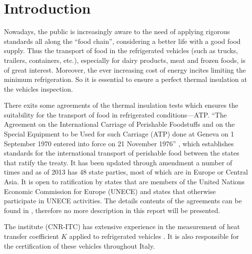 \newpage
\section{Introduction}
Nowadays, the public is increasingly aware to the need of applying rigorous standards all along the ``food chain'', considering a better life with a good food supply.  Thus the transport of food in the refrigerated vehicles (such as trucks, trailers, containers, etc.), especially for dairy products, meat and frozen foods, is of great interest. Moreover, the ever increasing cost of energy incites limiting the minimum refrigeration. So it is essential to ensure a perfect thermal insulation at the vehicles inspection. 

There exits some agreements of the thermal insulation tests which ensures the suitability for the transport of food in refrigerated conditions---ATP.
``The Agreement on the International Carriage of Perishable Foodstuffs and on the Special Equipment to be Used for such Carriage (ATP) done at Geneva on 1 September 1970 entered into force on 21 November 1976'' \citep{Geneva1970}, which establishes standards for the international transport of perishable food between the states that ratify the treaty. It has been updated through amendment a number of times and as of 2013 has 48 state parties, most of which are in Europe or Central Asia. It is open to ratification by states that are members of the United Nations Economic Commission for Europe (UNECE) and states that otherwise participate in UNECE activities\citep{ATP_wiki}.
The details contents of the agreements can be found in \citep{ATP_wiki, rossi2009k}, therefore no more description in this report will be presented.

The institute (CNR-ITC) has extensive experience in the measurement of heat transfer coefficient $K$ applied to refrigerated vehicles \citep{rossi2009k,bison1993automatic,bison2012geometrical,dragano2009experimental,grinzato2010r}. It is also responsible for the certification of these vehicles throughout Italy.

